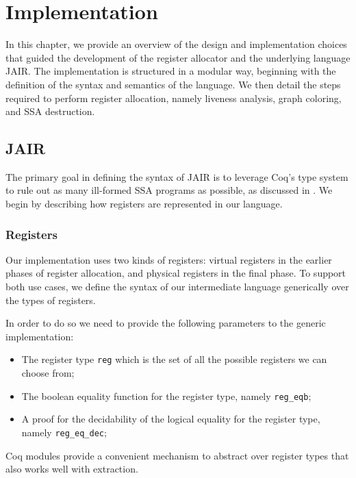 
\chapter{Implementation}
\label{cha:implementation}

In this chapter, we provide an overview of the design and implementation choices that guided the development of the register allocator and the underlying language JAIR. The implementation is structured in a modular way, beginning with the definition of the syntax and semantics of the language. We then detail the steps required to perform register allocation, namely liveness analysis, graph coloring, and SSA destruction.

\section{JAIR}
\label{sec:jair}

The primary goal in defining the syntax of JAIR is to leverage Coq’s type system to rule out as many ill-formed SSA programs as possible, as discussed in . We begin by describing how registers are represented in our language.

\subsection{Registers}

Our implementation uses two kinds of registers: virtual registers in the earlier phases of register allocation, and physical registers in the final phase. To support both use cases, we define the syntax of our intermediate language generically over the types of registers.

In order to do so we need to provide the following parameters to the generic implementation:
\begin{itemize}
    \item The register type \texttt{reg} which is the set of all the possible registers we can choose from;
    \item The boolean equality function for the register type, namely \texttt{reg\_eqb};
    \item A proof for the decidability of the logical equality for the register type, namely \texttt{reg\_eq\_dec};
\end{itemize}

Coq modules provide a convenient mechanism to abstract over register types that also works well with extraction.


